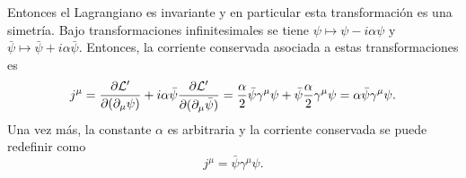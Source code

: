 \documentclass{article}
\begin{document}
Entonces el Lagrangiano es invariante y en particular esta transformación es una simetría. Bajo transformaciones infinitesimales se tiene $\psi\mapsto\psi-i\alpha\psi$ y $\bar{\psi}\mapsto\bar{\psi}+i\alpha\bar{\psi}$. Entonces, la corriente conservada asociada a estas transformaciones es
\begin{equation}
j^\mu=\pdv{\mathcal{L}'}{(\partial_\mu\psi)}(-i\alpha\psi)+i\alpha\bar{\psi}\pdv{\mathcal{L}'}{(\partial_\mu\bar{\psi})}=\frac{\alpha}{2}\bar{\psi}\gamma^\mu\psi+\bar{\psi}\frac{\alpha}{2}\gamma^\mu\psi=\alpha\bar{\psi}\gamma^\mu\psi.
\end{equation}
Una vez más, la constante $\alpha$ es arbitraria y la corriente conservada se puede redefinir como
\begin{equation}
j^\mu=\bar{\psi}\gamma^\mu\psi.
\end{equation}



\end{document}

